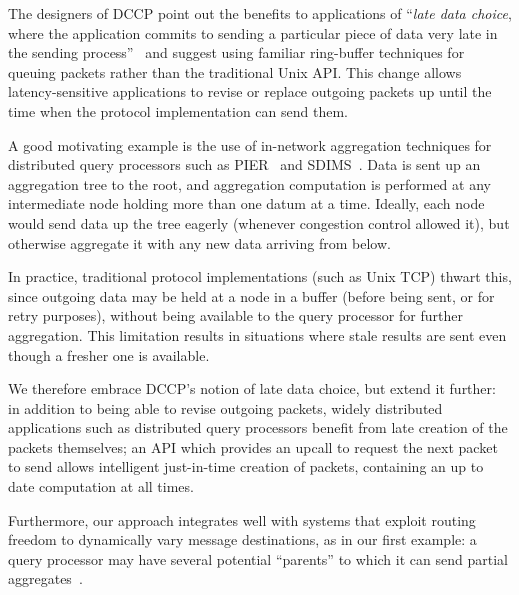 \documentclass{sig-alt-full}
\renewcommand{\subsection}[1]{\vspace{12pt}\noindent{\bf #1:}}
\begin{document}
\clearpage
\subsection{Application-level buffer management}
\label{sec:applicationBufferManagement}
The designers of DCCP point out the benefits to applications of 
``\emph{late data choice}, where the application commits to sending a
particular piece of data very late in the sending
process''~\cite{dccp-api} and suggest using familiar ring-buffer
techniques for queuing packets rather than the traditional Unix API.
This change allows latency-sensitive applications to revise or replace
outgoing packets up until the time when the protocol
implementation can send them. 

A good motivating example is the use of in-network
aggregation techniques for distributed query processors such as
PIER~\cite{pier-cidr} and SDIMS~\cite{dahlin}.  Data is sent
up an aggregation tree to the
root, and aggregation computation is performed at any intermediate
node holding more than one datum at a time.  Ideally, each node
would send data up the tree eagerly (whenever congestion
control allowed it), but otherwise aggregate it with any new data
arriving from below. 

In practice, traditional protocol implementations
(such as Unix TCP) thwart this, since outgoing data may be held at a
node in a buffer (before being sent, or for retry purposes), without
being available to the query processor for further aggregation. This limitation 
results in situations where stale results are sent even though a fresher one 
is available. 

We therefore embrace DCCP's notion of late data choice, but extend
it further: in addition to being able to revise outgoing packets, widely
distributed applications such as distributed query processors
benefit from late creation of the packets themselves; an API which
provides an upcall to request the next packet to send allows
intelligent just-in-time creation of packets, containing an up to date 
computation at all times.   

Furthermore, our approach integrates well with systems that exploit
routing freedom to dynamically vary message destinations, as in our
first example: a query processor may have several potential
``parents'' to which it can send partial aggregates~\cite{gibbons-sensys04}. 

\end{document}
